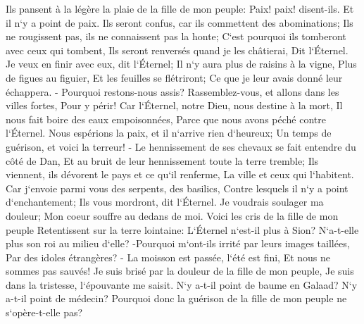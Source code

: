 \verse Ils pansent à la légère la plaie de la fille de mon peuple: Paix! paix! disent-ils. Et il n`y a point de paix. 
\verse Ils seront confus, car ils commettent des abominations; Ils ne rougissent pas, ils ne connaissent pas la honte; C`est pourquoi ils tomberont avec ceux qui tombent, Ils seront renversés quand je les châtierai, Dit l`Éternel. 
\verse Je veux en finir avec eux, dit l`Éternel; Il n`y aura plus de raisins à la vigne, Plus de figues au figuier, Et les feuilles se flétriront; Ce que je leur avais donné leur échappera. - 
\verse Pourquoi restons-nous assis? Rassemblez-vous, et allons dans les villes fortes, Pour y périr! Car l`Éternel, notre Dieu, nous destine à la mort, Il nous fait boire des eaux empoisonnées, Parce que nous avons péché contre l`Éternel. 
\verse Nous espérions la paix, et il n`arrive rien d`heureux; Un temps de guérison, et voici la terreur! - 
\verse Le hennissement de ses chevaux se fait entendre du côté de Dan, Et au bruit de leur hennissement toute la terre tremble; Ils viennent, ils dévorent le pays et ce qu`il renferme, La ville et ceux qui l`habitent. 
\verse Car j`envoie parmi vous des serpents, des basilics, Contre lesquels il n`y a point d`enchantement; Ils vous mordront, dit l`Éternel. 
\verse Je voudrais soulager ma douleur; Mon coeur souffre au dedans de moi. 
\verse Voici les cris de la fille de mon peuple Retentissent sur la terre lointaine: L`Éternel n`est-il plus à Sion? N`a-t-elle plus son roi au milieu d`elle? -Pourquoi m`ont-ils irrité par leurs images taillées, Par des idoles étrangères? - 
\verse La moisson est passée, l`été est fini, Et nous ne sommes pas sauvés! 
\verse Je suis brisé par la douleur de la fille de mon peuple, Je suis dans la tristesse, l`épouvante me saisit. 
\verse N`y a-t-il point de baume en Galaad? N`y a-t-il point de médecin? Pourquoi donc la guérison de la fille de mon peuple ne s`opère-t-elle pas? 


